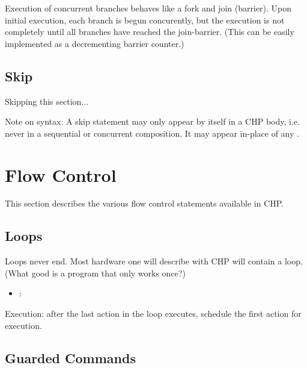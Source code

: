 Execution of concurrent branches behaves like a fork and join (barrier).
Upon initial execution, each branch is begun concurently, 
but the execution is not completely until all branches have reached
the join-barrier.  
(This can be easily implemented as a decrementing barrier counter.)

\subsection{Skip}
\label{sec:chp:stmts:skip}

Skipping this section...

Note on syntax: A skip statement may only appear by itself in a 
CHP body, i.e. never in a sequential or concurrent composition.  
It may appear in-place of any .  

\section{Flow Control}
\label{sec:chp:flow}

This section describes the various flow control statements available in CHP.  

\subsection{Loops}
\label{sec:chp:flow:loop}

Loops never end.  
Most hardware one will describe with CHP will contain a loop.  
(What good is a program that only works once?)

\begin{itemize}
\item {} : \chpbeginloop\  \chpendloop
\end{itemize}

Execution: after the last action in the loop executes, schedule
the first action for execution.  

\subsection{Guarded Commands}
\label{sec:chp:flow:guardedcmd}

